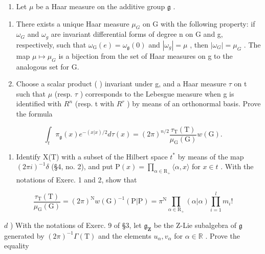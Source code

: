 \begin{enumerate}
\begin{enumerate}
\def\labelenumi{\arabic{enumi})}
\setcounter{enumi}{2}
\tightlist
\item
  Let \(\mu\) be a Haar measure on the additive group \(\mathfrak{g}\) .
\end{enumerate}

\begin{enumerate}
\def\labelenumi{\alph{enumi})}
\item
  There exists a unique Haar measure \(\mu_{G}\) on G with the following property: if \(\omega_{G}\) and \(\omega_{g}\) are invariant differential forms of degree n on G and g, respectively, such that \(\omega_{\mathrm{G}}(e)=\omega_{\mathfrak{g}}(0)\) and \(|\omega_{g}|=\mu\) , then \(|\omega_{G}|=\mu_{G}\) . The map \(\mu\mapsto\mu_{G}\) is a bijection from the set of Haar measures on g to the analogous set for G.
\item
  Choose a scalar product ( \textbar{} ) invariant under g, and a Haar measure \(\tau\) on t such that \(\mu\) (resp. \(\tau\) ) corresponds to the Lebesgue measure when g is identified with \(R^{n}\) (resp. t with \(R^{r}\) ) by means of an orthonormal basis. Prove the formula
\end{enumerate}

\[
\int_ {t} \pi_ {\mathfrak {g}} (x) e ^ {- (x | x) / 2} d \tau (x) = (2 \pi) ^ {n / 2} \frac {\tau_ {\mathrm{T}} (\mathrm{T})}{\mu_ {\mathrm{G}} (\mathrm{G})} w (\mathrm{G}).
\]

\begin{enumerate}
\def\labelenumi{\alph{enumi})}
\setcounter{enumi}{2}
\tightlist
\item
  Identify X(T) with a subset of the Hilbert space \(t^{*}\) by means of the map \((2\pi i)^{-1}\delta\) (§4, no. 2), and put \(\mathrm{P}(x)=\prod_{\alpha\in\mathrm{R}_{+}}\langle\alpha,x\rangle\) for \(x\in t\) . With the notations of Exerc. 1 and 2, show that
\end{enumerate}

\[
\frac {\tau_ {\mathrm{T}} (\mathrm{T})}{\mu_ {\mathrm{G}} (\mathrm{G})} = (2 \pi) ^ {\mathrm{N}} w (\mathrm{G}) ^ {- 1} (\mathrm{P} | \mathrm{P}) = \pi^ {\mathrm{N}} \prod_ {\alpha \in \mathrm{R} _ {+}} (\alpha | \alpha) \prod_ {i = 1} ^ {l} m _ {i}!
\]

\(d\) ) With the notations of Exerc. 9 of §3, let \(\mathfrak{g}_{\mathbf{Z}}\) be the Z-Lie subalgebra of \(\mathfrak{g}\) generated by \((2\pi)^{-1}\Gamma (\mathrm{T})\) and the elements \(u_{\alpha},v_{\alpha}\) for \(\alpha \in \mathbb{R}\) . Prove the equality


\end{enumerate}
